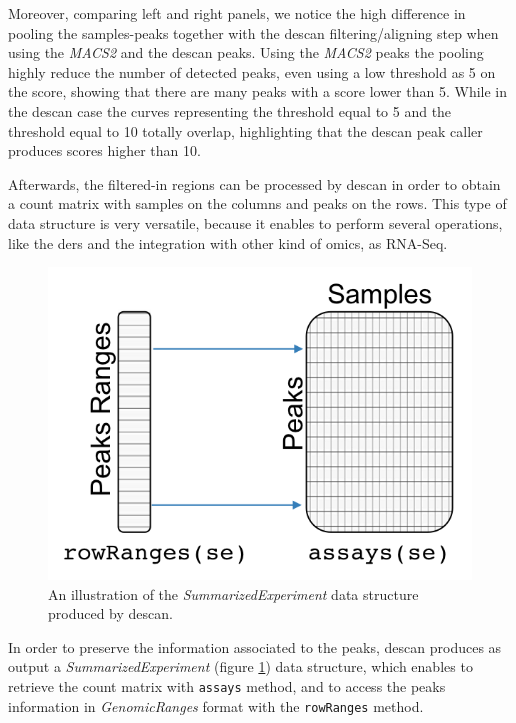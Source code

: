 Moreover, comparing left and right panels, we notice the high difference in pooling the samples-peaks together with the \gls{descan} filtering/aligning step when using the \textit{MACS2} and the \gls{descan} peaks.
Using the \textit{MACS2} peaks the pooling highly reduce the number of detected peaks, even using a low threshold as 5 on the score, showing that there are many peaks with a score lower than 5.
While in the \gls{descan} case the curves representing the threshold equal to 5 and the threshold equal to 10 totally overlap, highlighting that the \gls{descan} peak caller produces scores higher than 10.

Afterwards, the filtered-in regions can be processed by \gls{descan} in order to obtain a count matrix with samples on the columns and peaks on the rows.
This type of data structure is very versatile, because it enables to perform several operations, like the \glspl{der} and the integration with other kind of omics, as RNA-Seq.

\begin{figure}[H]
\centering
\includegraphics[scale=.5]{img/descan2/counts.png}
\caption[\gls{descan} counts illustration]{An illustration of the \textit{SummarizedExperiment} data structure produced by \gls{descan}.}
\label{fig:countsdescan}
\centering
\end{figure}

In order to preserve the information associated to the peaks, \gls{descan} produces as output a \textit{SummarizedExperiment} (figure \ref{fig:countsdescan}) data structure, which enables to retrieve the count matrix with \lstinline!assays! method, and to access the peaks information in \textit{GenomicRanges} format with the \lstinline!rowRanges! method.

